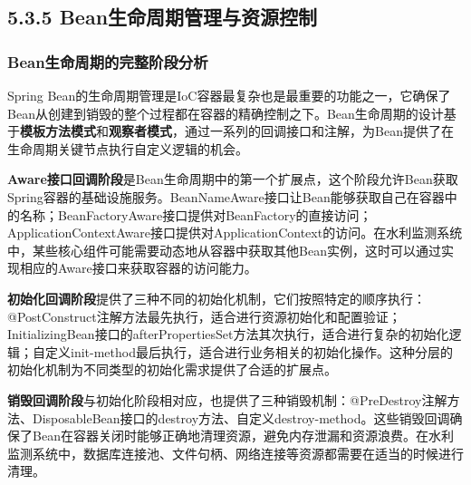 \subsection{5.3.5 Bean生命周期管理与资源控制}\label{beanux751fux547dux5468ux671fux7ba1ux7406ux4e0eux8d44ux6e90ux63a7ux5236}

\subsubsection{Bean生命周期的完整阶段分析}\label{beanux751fux547dux5468ux671fux7684ux5b8cux6574ux9636ux6bb5ux5206ux6790}

Spring Bean的生命周期管理是IoC容器最复杂也是最重要的功能之一，它确保了Bean从创建到销毁的整个过程都在容器的精确控制之下。Bean生命周期的设计基于\textbf{模板方法模式}和\textbf{观察者模式}，通过一系列的回调接口和注解，为Bean提供了在生命周期关键节点执行自定义逻辑的机会。

\textbf{Aware接口回调阶段}是Bean生命周期中的第一个扩展点，这个阶段允许Bean获取Spring容器的基础设施服务。BeanNameAware接口让Bean能够获取自己在容器中的名称；BeanFactoryAware接口提供对BeanFactory的直接访问；ApplicationContextAware接口提供对ApplicationContext的访问。在水利监测系统中，某些核心组件可能需要动态地从容器中获取其他Bean实例，这时可以通过实现相应的Aware接口来获取容器的访问能力。

\textbf{初始化回调阶段}提供了三种不同的初始化机制，它们按照特定的顺序执行：@PostConstruct注解方法最先执行，适合进行资源初始化和配置验证；InitializingBean接口的afterPropertiesSet方法其次执行，适合进行复杂的初始化逻辑；自定义init-method最后执行，适合进行业务相关的初始化操作。这种分层的初始化机制为不同类型的初始化需求提供了合适的扩展点。

\textbf{销毁回调阶段}与初始化阶段相对应，也提供了三种销毁机制：@PreDestroy注解方法、DisposableBean接口的destroy方法、自定义destroy-method。这些销毁回调确保了Bean在容器关闭时能够正确地清理资源，避免内存泄漏和资源浪费。在水利监测系统中，数据库连接池、文件句柄、网络连接等资源都需要在适当的时候进行清理。

